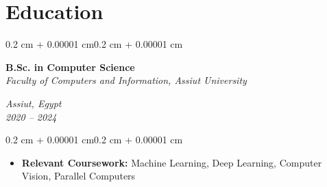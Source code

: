 \documentclass[10pt, letterpaper]{article}
\newenvironment{highlights}{
  \begin{itemize}[
    topsep=0.10 cm,
    parsep=0.10 cm,
    partopsep=0pt,
    itemsep=0pt,
    leftmargin=0.4 cm + 10pt
  ]}
  {\end{itemize}
}
\newenvironment{onecolentry}{
  \begin{adjustwidth}{0.2 cm + 0.00001 cm}{0.2 cm + 0.00001 cm}
}{
  \end{adjustwidth}
}
\newenvironment{twocolentry}[2][]{
  \onecolentry
  \def\secondColumn{#2}
  \setcolumnwidth{\fill, 4.5 cm}
  \begin{paracol}{2}
}{
  \switchcolumn \raggedleft \secondColumn
  \end{paracol}
  \endonecolentry
}
\begin{document}
\section{Education}
\begin{twocolentry}{
  \textit{Assiut, Egypt} \\
  \textit{2020 -- 2024}}
  \textbf{B.Sc. in Computer Science} \\
  \textit{Faculty of Computers and Information, Assiut University}
\end{twocolentry}
\vspace{0.10 cm}
\begin{onecolentry}
  \begin{highlights}
    \item \textbf{Relevant Coursework:} Machine Learning, Deep Learning, Computer Vision, Parallel Computers
  \end{highlights}
\end{onecolentry}

\end{document}
